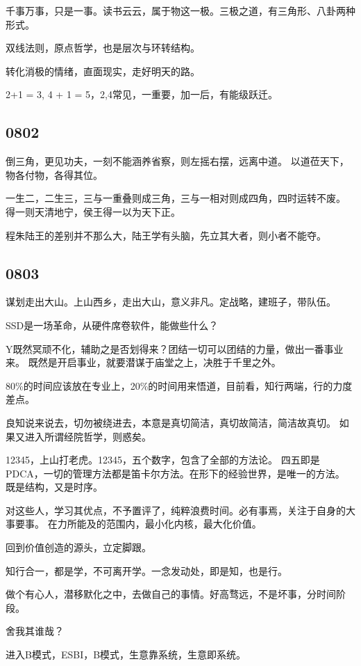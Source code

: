 千事万事，只是一事。读书云云，属于物这一极。三极之道，有三角形、八卦两种形式。

双线法则，原点哲学，也是层次与环转结构。

转化消极的情绪，直面现实，走好明天的路。

2+1 = 3, 4 + 1 = 5，2,4常见，一重要，加一后，有能级跃迁。

\subsection{0802}

倒三角，更见功夫，一刻不能涵养省察，则左摇右摆，远离中道。
以道莅天下，物各付物，各得其位。

一生二，二生三，三与一重叠则成三角，三与一相对则成四角，四时运转不废。
得一则天清地宁，侯王得一以为天下正。

程朱陆王的差别并不那么大，陆王学有头脑，先立其大者，则小者不能夺。

\subsection{0803}

谋划走出大山。上山西乡，走出大山，意义非凡。定战略，建班子，带队伍。

SSD是一场革命，从硬件席卷软件，能做些什么？

Y既然冥顽不化，辅助之是否划得来？团结一切可以团结的力量，做出一番事业来。
既然是开启事业，就要潜谋于庙堂之上，决胜于千里之外。

80\%的时间应该放在专业上，20\%的时间用来悟道，目前看，知行两端，行的力度差点。

良知说来说去，切勿被绕进去，本意是真切简洁，真切故简洁，简洁故真切。
如果又进入所谓经院哲学，则惑矣。

12345，上山打老虎。12345，五个数字，包含了全部的方法论。
四五即是PDCA，一切的管理方法都是笛卡尔方法。在形下的经验世界，是唯一的方法。
既是结构，又是时序。

对这些人，学习其优点，不予置评了，纯粹浪费时间。必有事焉，关注于自身的大事要事。
在力所能及的范围内，最小化内核，最大化价值。

回到价值创造的源头，立定脚跟。

知行合一，都是学，不可离开学。一念发动处，即是知，也是行。

做个有心人，潜移默化之中，去做自己的事情。好高骛远，不是坏事，分时间阶段。

舍我其谁哉？

进入B模式，ESBI，B模式，生意靠系统，生意即系统。

